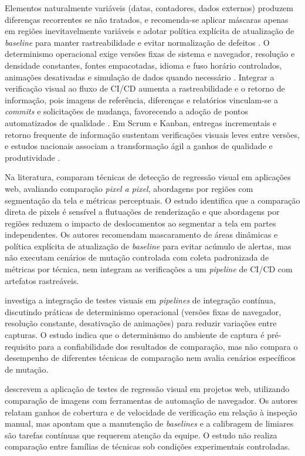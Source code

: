\documentclass{UNESC}
\begin{document}
Elementos naturalmente variáveis (datas, contadores, dados externos) produzem diferenças recorrentes se não tratados, e recomenda-se aplicar máscaras apenas em regiões inevitavelmente variáveis e adotar política explícita de atualização de \emph{baseline} para manter rastreabilidade e evitar normalização de defeitos \cite{tanno2020,tanoue2018vrt}. O determinismo operacional exige versões fixas de sistema e navegador, resolução e densidade constantes, fontes empacotadas, idioma e fuso horário controlados, animações desativadas e simulação de dados quando necessário \cite{heinonen2020}. Integrar a verificação visual ao fluxo de CI/CD aumenta a rastreabilidade e o retorno de informação, pois imagens de referência, diferenças e relatórios vinculam-se a \emph{commits} e solicitações de mudança, favorecendo a adoção de pontos automatizados de qualidade \cite{shahin2017,hilton2016ci,maia2024}. Em Scrum e Kanban, entregas incrementais e retorno frequente de informação sustentam verificações visuais leves entre versões, e estudos nacionais associam a transformação ágil a ganhos de qualidade e produtividade \cite{bessa2018,costa2023}.

Na literatura,  comparam técnicas de detecção de regressão visual em aplicações web, avaliando comparação \emph{pixel a pixel}, abordagens por regiões com segmentação da tela e métricas perceptuais. O estudo identifica que a comparação direta de pixels é sensível a flutuações de renderização e que abordagens por regiões reduzem o impacto de deslocamentos ao segmentar a tela em partes independentes. Os autores recomendam mascaramento de áreas dinâmicas e política explícita de atualização de \emph{baseline} para evitar acúmulo de alertas, mas não executam cenários de mutação controlada com coleta padronizada de métricas por técnica, nem integram as verificações a um \emph{pipeline} de CI/CD com artefatos rastreáveis.

 investiga a integração de testes visuais em \emph{pipelines} de integração contínua, discutindo práticas de determinismo operacional (versões fixas de navegador, resolução constante, desativação de animações) para reduzir variações entre capturas. O estudo indica que o determinismo do ambiente de captura é pré-requisito para a confiabilidade dos resultados de comparação, mas não compara o desempenho de diferentes técnicas de comparação nem avalia cenários específicos de mutação.

 descrevem a aplicação de testes de regressão visual em projetos web, utilizando comparação de imagens com ferramentas de automação de navegador. Os autores relatam ganhos de cobertura e de velocidade de verificação em relação à inspeção manual, mas apontam que a manutenção de \emph{baselines} e a calibragem de limiares são tarefas contínuas que requerem atenção da equipe. O estudo não realiza comparação entre famílias de técnicas sob condições experimentais controladas.
\end{document}
